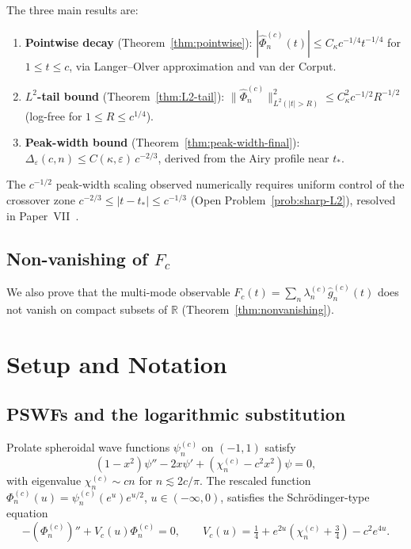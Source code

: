 \documentclass[12pt,a4paper]{amsart}
\theoremstyle{definition}
\theoremstyle{remark}
\begin{document}
The three main results are:
\begin{enumerate}[(R1)]
\item \textbf{Pointwise decay} (Theorem~\ref{thm:pointwise}):
$|\widehat\Phi_n^{(c)}(t)| \le C_\kappa c^{-1/4} t^{-1/4}$
for $1 \le t \le c$,
via Langer--Olver approximation and van der Corput.

\item \textbf{$L^2$-tail bound} (Theorem~\ref{thm:L2-tail}):
$\|\widehat\Phi_n^{(c)}\|_{L^2(|t|>R)}^2 \le C_\kappa^2 c^{-1/2} R^{-1/2}$
(log-free for $1 \le R \le c^{1/4}$).

\item \textbf{Peak-width bound} (Theorem~\ref{thm:peak-width-final}):
$\Delta_\varepsilon(c,n) \le C(\kappa,\varepsilon)\,c^{-2/3}$,
derived from the Airy profile near $t_*$.
\end{enumerate}

The $c^{-1/2}$ peak-width scaling observed numerically
requires uniform control of the crossover zone
$c^{-2/3} \le |t-t_*| \le c^{-1/3}$
(Open Problem~\ref{prob:sharp-L2}),
resolved in Paper~VII~\cite{PaperVII}.

\subsection{Non-vanishing of $F_c$}

We also prove that the multi-mode observable
$F_c(t) = \sum_n \lambda_n^{(c)} \widehat{g}_n^{(c)}(t)$
does not vanish on compact subsets of $\mathbb{R}$ (Theorem~\ref{thm:nonvanishing}).

\section{Setup and Notation}
\label{sec:setup}

\subsection{PSWFs and the logarithmic substitution}

Prolate spheroidal wave functions $\psi_n^{(c)}$ on $(-1,1)$ satisfy
\begin{equation}
\label{eq:PSWE}
(1-x^2)\psi'' - 2x\psi' + (\chi_n^{(c)} - c^2 x^2)\psi = 0,
\end{equation}
with eigenvalue $\chi_n^{(c)} \sim cn$ for $n \lesssim 2c/\pi$.
The rescaled function
$\Phi_n^{(c)}(u) = \psi_n^{(c)}(e^u)e^{u/2}$, $u \in (-\infty,0)$,
satisfies the Schr\"odinger-type equation
\begin{equation}
\label{eq:Schrodinger}
-(\Phi_n^{(c)})'' + V_c(u)\Phi_n^{(c)} = 0,
\qquad V_c(u) = \tfrac{1}{4} + e^{2u}(\chi_n^{(c)}+\tfrac{3}{4}) - c^2 e^{4u}.
\end{equation}
\end{document}

